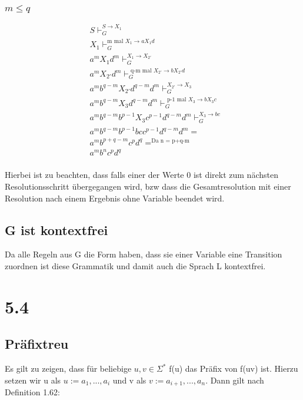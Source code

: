 \documentclass[12pt, a4paper]{article}
\begin{document}
\subsubsection*{$m \leq q$}
\begin{align*}
&S 																			\vdash_G^{S \rightarrow X_1} \\
&X_1 																		\vdash_G^{\text{m mal } X_1 \rightarrow a X_1 d} \\
&a^m X_1 d^m 														\vdash_G^{X_1 \rightarrow X_{2'} } \\
&a^m X_{2'} d^m					 								\vdash_G^{\text{ q-m mal } X_{2'} \rightarrow b X_{2'} d}  \\
&a^m b^{q-m} X_{2'} d^{q-m} d^m 						\vdash_G^{X_{2'} \rightarrow X_3} \\
&a^m b^{q-m} X_3 d^{q-m} d^m							 \vdash_G^{\text{ p-1 mal } X_3 \rightarrow b X_3 c }\\
&a^m b^{q-m} b^{p-1} X_3 c^{p-1} d^{q-m} d^m \vdash_G^{X_3 \rightarrow bc} \\
&a^m b^{q-m} b^{p-1} bc c^{p-1} d^{q-m} d^m	 = \\
&a^m b^{p+q-m}c^{p} d^{q}	 =^{\text{Da n = p+q-m}} \\
&a^m b^n c^p d^q \\
\end{align*}


Hierbei ist zu beachten, dass falls einer der Werte 0 ist direkt zum nächsten Resolutionsschritt übergegangen wird, bzw dass die Gesamtresolution mit einer Resolution nach einem Ergebnis ohne Variable beendet wird.
\subsection*{G ist kontextfrei}
Da alle Regeln aus G die Form haben, dass sie einer Variable eine Transition zuordnen ist diese Grammatik und damit auch die Sprach L kontextfrei.

\section*{5.4}

\subsection*{Präfixtreu}
Es gilt zu zeigen, dass für beliebige $u,v \in \Sigma^*$ f(u) das Präfix von f(uv) ist. Hierzu setzen wir u als $u := a_1,...,a_i$ und v als $v := a_{i+1},...,a_n$. Dann gilt nach Definition 1.62:
\end{document}
